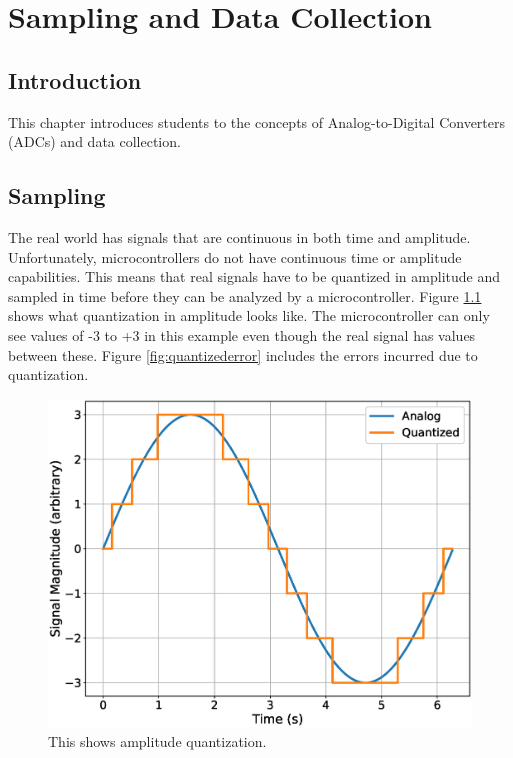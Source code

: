 \chapter{Sampling and Data Collection}

\section{Introduction}
This chapter introduces students to the concepts of Analog-to-Digital Converters (ADCs) and data collection.

\section{Sampling}

The real world has signals that are continuous in both time and amplitude. Unfortunately, microcontrollers 
do not have continuous time or amplitude capabilities. This means that real signals have to be quantized 
in amplitude and sampled in time before they can be analyzed by a microcontroller. Figure \ref{fig:quantized}
shows what quantization in amplitude looks like. The microcontroller can only see values of -3 to +3 in 
this example even though the real signal has values between these. Figure \ref{fig:quantizederror} 
includes the errors incurred due to quantization.

\begin{figure}[!htb]
	\centering
	\includegraphics[scale=0.5]{dataCollection/quantized.eps}
	\caption{This shows amplitude quantization.}
	\label{fig:quantized}
\end{figure}

